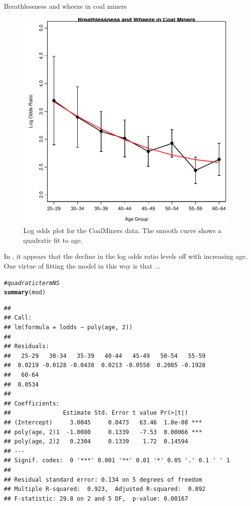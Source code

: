 \documentclass[11pt]{book}\usepackage[]{graphicx}\usepackage[]{color}
\makeatletter
\newcommand{\hlcom}[1]{\textcolor[rgb]{0.678,0.584,0.686}{\textit{#1}}}%
\newcommand{\hlstd}[1]{\textcolor[rgb]{0.345,0.345,0.345}{#1}}%
\newcommand{\hlkwd}[1]{\textcolor[rgb]{0.737,0.353,0.396}{\textbf{#1}}}%
\newenvironment{kframe}{%
 \def\at@end@of@kframe{}%
 \ifinner\ifhmode%
  \def\at@end@of@kframe{\end{minipage}}%
  \begin{minipage}{\columnwidth}%
 \fi\fi%
 \def\FrameCommand##1{\hskip\@totalleftmargin \hskip-\fboxsep
 \colorbox{shadecolor}{##1}\hskip-\fboxsep
     \hskip-\linewidth \hskip-\@totalleftmargin \hskip\columnwidth}%
 \MakeFramed {\advance\hsize-\width
   \@totalleftmargin\z@ \linewidth\hsize
   \@setminipage}}%
 {\par\unskip\endMakeFramed%
 \at@end@of@kframe}
\newenvironment{knitrout}{}{} %
\renewenvironment{knitrout}{\small\renewcommand{\baselinestretch}{.85}}{} %
\makeatother
\begin{document}
\begin{Example}[wheeze1]{Breathlessness and wheeze in coal miners}
\begin{knitrout}
\begin{figure}[htbp]
\centerline{\includegraphics[width=.6\textwidth]{ch04/fig/coalminer3} }

\caption[Log odds plot for the CoalMiners data]{Log odds plot for the CoalMiners data.  The smooth curve shows a quadratic fit to age.\label{fig:coalminer3}}
\end{figure}


\end{knitrout}

In , it appears that the decline in the
log odds ratio levels off with increasing age.  One virtue of
fitting the model in this way is that ...
\begin{knitrout}
\color{fgcolor}\begin{kframe}
\begin{alltt}
\hlcom{# quadratic term NS}
\hlkwd{summary}\hlstd{(mod)}
\end{alltt}
\begin{verbatim}
## 
## Call:
## lm(formula = lodds ~ poly(age, 2))
## 
## Residuals:
##   25-29   30-34   35-39   40-44   45-49   50-54   55-59 
##  0.0219 -0.0128 -0.0438  0.0213 -0.0558  0.2085 -0.1928 
##   60-64 
##  0.0534 
## 
## Coefficients:
##               Estimate Std. Error t value Pr(>|t|)    
## (Intercept)     3.0045     0.0473   63.46  1.8e-08 ***
## poly(age, 2)1  -1.0080     0.1339   -7.53  0.00066 ***
## poly(age, 2)2   0.2304     0.1339    1.72  0.14594    
## ---
## Signif. codes:  0 '***' 0.001 '**' 0.01 '*' 0.05 '.' 0.1 ' ' 1
## 
## Residual standard error: 0.134 on 5 degrees of freedom
## Multiple R-squared:  0.923,	Adjusted R-squared:  0.892 
## F-statistic: 29.8 on 2 and 5 DF,  p-value: 0.00167
\end{verbatim}
\end{kframe}
\end{knitrout}


\end{Example}
\end{document}
